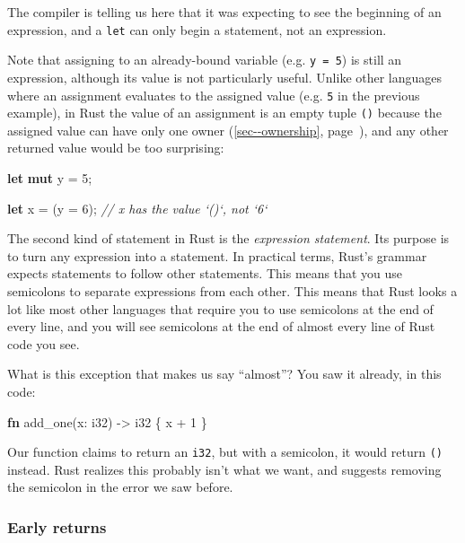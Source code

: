 \documentclass[a4paper,]{book}
\renewcommand*{\hypertarget}[3][\ar]{%
  \def\ar{#2}%
  \label{#1}%
  #3}
\renewcommand*{\hyperlink}[2]{%
 #2 (\autoref{#1}, page~\pageref{#1})}
\newenvironment{Shaded}{\begin{snugshade}}{\end{snugshade}}
\newcommand{\KeywordTok}[1]{\textcolor[rgb]{0.13,0.29,0.53}{\textbf{{#1}}}}
\newcommand{\DataTypeTok}[1]{\textcolor[rgb]{0.13,0.29,0.53}{{#1}}}
\newcommand{\DecValTok}[1]{\textcolor[rgb]{0.00,0.00,0.81}{{#1}}}
\newcommand{\CommentTok}[1]{\textcolor[rgb]{0.56,0.35,0.01}{\textit{{#1}}}}
\newcommand{\NormalTok}[1]{{#1}}
\begin{document}
The compiler is telling us here that it was expecting to see the
beginning of an expression, and a \texttt{let} can only begin a
statement, not an expression.

Note that assigning to an already-bound variable (e.g. \texttt{y\ =\ 5})
is still an expression, although its value is not particularly useful.
Unlike other languages where an assignment evaluates to the assigned
value (e.g. \texttt{5} in the previous example), in Rust the value of an
assignment is an empty tuple \texttt{()} because the assigned value can
have \protect\hyperlink{sec--ownership}{only one owner}, and any other
returned value would be too surprising:

\begin{Shaded}
\begin{Highlighting}[]
\KeywordTok{let} \KeywordTok{mut} \NormalTok{y = }\DecValTok{5}\NormalTok{;}

\KeywordTok{let} \NormalTok{x = (y = }\DecValTok{6}\NormalTok{);  }\CommentTok{// x has the value `()`, not `6`}
\end{Highlighting}
\end{Shaded}

The second kind of statement in Rust is the \emph{expression statement}.
Its purpose is to turn any expression into a statement. In practical
terms, Rust's grammar expects statements to follow other statements.
This means that you use semicolons to separate expressions from each
other. This means that Rust looks a lot like most other languages that
require you to use semicolons at the end of every line, and you will see
semicolons at the end of almost every line of Rust code you see.

What is this exception that makes us say ``almost''? You saw it already,
in this code:

\begin{Shaded}
\begin{Highlighting}[]
\KeywordTok{fn} \NormalTok{add_one(x: }\DataTypeTok{i32}\NormalTok{) -> }\DataTypeTok{i32} \NormalTok{\{}
    \NormalTok{x + }\DecValTok{1}
\NormalTok{\}}
\end{Highlighting}
\end{Shaded}

Our function claims to return an \texttt{i32}, but with a semicolon, it
would return \texttt{()} instead. Rust realizes this probably isn't what
we want, and suggests removing the semicolon in the error we saw before.

\hypertarget{early-returns}{\subsubsection{Early
returns}\label{early-returns}}
\end{document}
